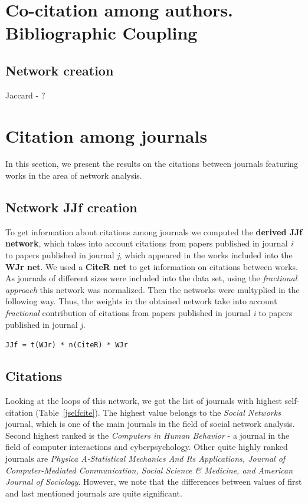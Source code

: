 \documentclass[11pt]{article} %
\begin{document}

\section{Co-citation among authors. Bibliographic Coupling }

\subsection{Network creation} 

Jaccard - ? 

\section{Citation among journals}

In this section, we present the results on the citations between journals featuring works in the area of network analysis. 

\subsection{Network JJf creation}

To get information about citations among journals we computed the \textbf{derived JJf network}, which takes into account citations from papers published in journal \textit{i} to papers published in journal \textit{j}, which appeared in the works included into the \textbf{WJr net}. We used a \textbf{CiteR net} to get information on citations between works. As journals of different sizes were included into the data set, using the \textit{fractional approach} this network was normalized. Then the networks were multyplied in the following way. Thus, the weights in the obtained network take into account \textit{fractional} contribution of citations from papers published in journal \textit{i} to papers published in journal \textit{j}.   \medskip 

\texttt{JJf = t(WJr) * n(CiteR) * WJr}

\subsection{Citations}

Looking at the loops of this network, we got the list of journals with highest self-citation (Table~\ref{jselfcite}). The highest value belongs to the \textit{Social Networks} journal, which is one of the main journals in the field of social network analysis. Second highest ranked is the \textit{Computers in Human Behavior} - a journal in the field of computer interactions and cyberpsychology. Other quite highly ranked journals are \textit{Physica A-Statistical Mechanics And Its Applications, Journal of Computer-Mediated Communication, Social Science \& Medicine, and American Journal of Sociology}. However, we note that the differences between values of first and last mentioned journals are quite significant. \medskip 
\end{document}
